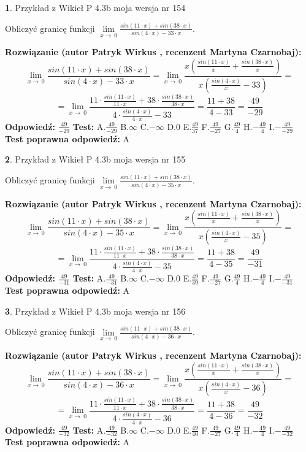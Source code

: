 \documentclass[12pt, a4paper]{article}
\theoremstyle{definition} %
\newtheorem{zad}{}
\newcommand{\zadStart}[1]{\begin{zad}#1\newline}
\newcommand{\zadStop}{\end{zad}}
\newcommand{\rozwStart}[2]{\noindent \textbf{Rozwiązanie (autor #1 , recenzent #2): }\newline}
\newcommand{\rozwStop}{\newline}
\newcommand{\odpStart}{\noindent \textbf{Odpowiedź:}\newline}
\newcommand{\odpStop}{\newline}
\newcommand{\testStart}{\noindent \textbf{Test:}\newline}
\newcommand{\testStop}{\newline}
\newcommand{\kluczStart}{\noindent \textbf{Test poprawna odpowiedź:}\newline}
\newcommand{\kluczStop}{\newline}
\begin{document}
\zadStart{Przykład z Wikieł P 4.3b moja wersja nr 154}


Obliczyć granicę funkcji $\lim\limits_{x\to\ 0}\frac{sin(11 \cdot x)+sin(38 \cdot x)}{sin(4 \cdot x)-33 \cdot x}$.
\zadStop
\rozwStart{Patryk Wirkus}{Martyna Czarnobaj}
$$\lim\limits_{x\to\ 0}\frac{sin(11 \cdot x)+sin(38 \cdot x)}{sin(4 \cdot x)-33 \cdot x}=\lim\limits_{x\to\ 0}\frac{x(\frac{sin(11 \cdot x)}{x}+\frac{sin(38 \cdot x)}{x})}{x(\frac{sin(4 \cdot x)}{x}-33)}=$$
$$=\lim\limits_{x\to\ 0}\frac{11 \cdot \frac{sin(11 \cdot x)}{11 \cdot x}+38 \cdot \frac{sin(38 \cdot x)}{38 \cdot x}}{4 \cdot \frac{sin(4 \cdot x)}{4 \cdot x}-33}=\frac{11+38}{4-33} = \frac{49}{-29}$$
\rozwStop
\odpStart
$\frac{49}{-29}$
\odpStop
\testStart
A.$\frac{49}{-29}$
B.$\infty$
C.$-\infty$
D.$0$
E.$\frac{49}{37}$
F.$\frac{49}{-27}$
G.$\frac{49}{4}$
H.$-\frac{49}{4}$
I.$-\frac{49}{-29}$
\testStop
\kluczStart
A
\kluczStop



\zadStart{Przykład z Wikieł P 4.3b moja wersja nr 155}


Obliczyć granicę funkcji $\lim\limits_{x\to\ 0}\frac{sin(11 \cdot x)+sin(38 \cdot x)}{sin(4 \cdot x)-35 \cdot x}$.
\zadStop
\rozwStart{Patryk Wirkus}{Martyna Czarnobaj}
$$\lim\limits_{x\to\ 0}\frac{sin(11 \cdot x)+sin(38 \cdot x)}{sin(4 \cdot x)-35 \cdot x}=\lim\limits_{x\to\ 0}\frac{x(\frac{sin(11 \cdot x)}{x}+\frac{sin(38 \cdot x)}{x})}{x(\frac{sin(4 \cdot x)}{x}-35)}=$$
$$=\lim\limits_{x\to\ 0}\frac{11 \cdot \frac{sin(11 \cdot x)}{11 \cdot x}+38 \cdot \frac{sin(38 \cdot x)}{38 \cdot x}}{4 \cdot \frac{sin(4 \cdot x)}{4 \cdot x}-35}=\frac{11+38}{4-35} = \frac{49}{-31}$$
\rozwStop
\odpStart
$\frac{49}{-31}$
\odpStop
\testStart
A.$\frac{49}{-31}$
B.$\infty$
C.$-\infty$
D.$0$
E.$\frac{49}{39}$
F.$\frac{49}{-27}$
G.$\frac{49}{4}$
H.$-\frac{49}{4}$
I.$-\frac{49}{-31}$
\testStop
\kluczStart
A
\kluczStop



\zadStart{Przykład z Wikieł P 4.3b moja wersja nr 156}


Obliczyć granicę funkcji $\lim\limits_{x\to\ 0}\frac{sin(11 \cdot x)+sin(38 \cdot x)}{sin(4 \cdot x)-36 \cdot x}$.
\zadStop
\rozwStart{Patryk Wirkus}{Martyna Czarnobaj}
$$\lim\limits_{x\to\ 0}\frac{sin(11 \cdot x)+sin(38 \cdot x)}{sin(4 \cdot x)-36 \cdot x}=\lim\limits_{x\to\ 0}\frac{x(\frac{sin(11 \cdot x)}{x}+\frac{sin(38 \cdot x)}{x})}{x(\frac{sin(4 \cdot x)}{x}-36)}=$$
$$=\lim\limits_{x\to\ 0}\frac{11 \cdot \frac{sin(11 \cdot x)}{11 \cdot x}+38 \cdot \frac{sin(38 \cdot x)}{38 \cdot x}}{4 \cdot \frac{sin(4 \cdot x)}{4 \cdot x}-36}=\frac{11+38}{4-36} = \frac{49}{-32}$$
\rozwStop
\odpStart
$\frac{49}{-32}$
\odpStop
\testStart
A.$\frac{49}{-32}$
B.$\infty$
C.$-\infty$
D.$0$
E.$\frac{49}{40}$
F.$\frac{49}{-27}$
G.$\frac{49}{4}$
H.$-\frac{49}{4}$
I.$-\frac{49}{-32}$
\testStop
\kluczStart
A
\kluczStop
\end{document}
